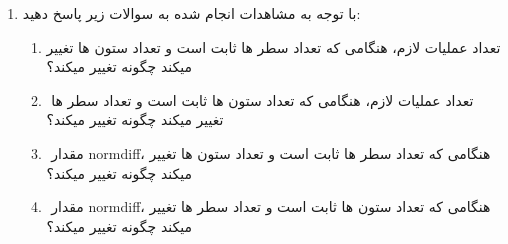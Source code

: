 \documentclass{article}
\begin{document}
\begin{enumerate}
	
	\item 
	 با توجه به مشاهدات انجام شده به سوالات زیر پاسخ دهید:
		 \begin{enumerate}
		 	\item 
		 	تعداد عملیات لازم، هنگامی که تعداد سطر ها ثابت است و تعداد ستون ها تغییر میکند چگونه تغییر میکند؟
		 	\item 
		 	‌ تعداد عملیات لازم، هنگامی که تعداد ستون ها ثابت است و تعداد سطر ها تغییر میکند چگونه تغییر میکند؟
		 	\item 
		 	‌ مقدار normdiff، هنگامی که تعداد سطر ها ثابت است و تعداد ستون ها تغییر میکند چگونه تغییر میکند؟
		 	\item 
		 	‌ مقدار normdiff، هنگامی که تعداد ستون ها ثابت است و تعداد سطر ها تغییر میکند چگونه تغییر میکند؟
		 	 \end{enumerate}
	

\end{enumerate}
\end{document}
